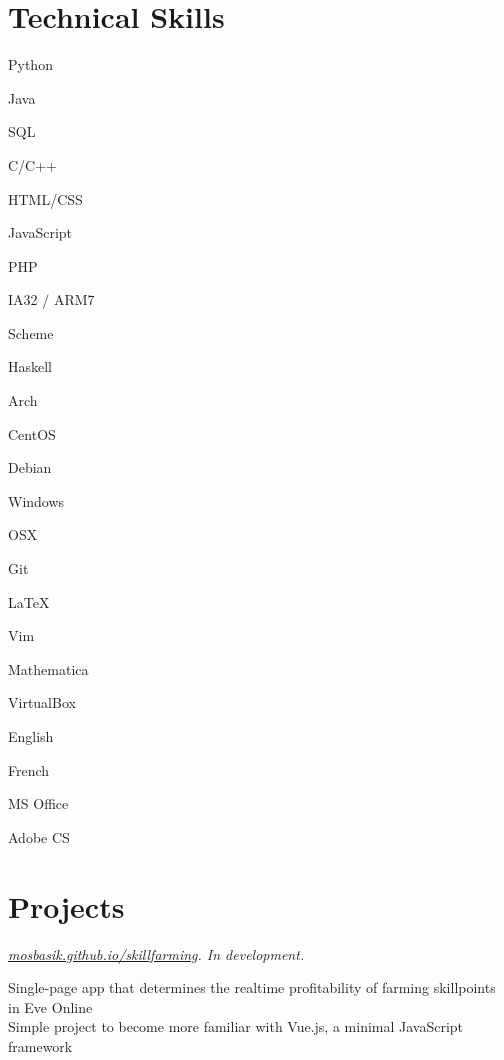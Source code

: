 \documentclass[10pt,letterpaper, full]{article}
\newcommand{\pjtitle}[1]{\renewcommand{\givenpjtitle}{#1}}
\newcommand{\pjtime}[1]{\renewcommand{\givenpjtime}{#1}}
\newcommand{\pjbody}[1]{\renewcommand{\givenpjbody}{#1}}
\newcommand{\givenpjtitle}{REQUIRED!}
\newcommand{\givenpjtime}{REQUIRED!}
\newcommand{\givenpjbody}{REQUIRED!}
\newenvironment{projectenv}
    {
        \begin{adjustwidth}{1em}{0em}
    }
    {
        \textit{\givenpjtitle. \givenpjtime.}

        \begin{minipage}[l]{\textwidth}
            \givenpjbody%
        \end{minipage}\\%


        \end{adjustwidth}
    }
\begin{document}
\section{Technical Skills}
\begin{adjustwidth}{1em}{0em}
    \begin{minipage}[t]{.195\textwidth}
        Python

        Java

        SQL

        C/C++

        HTML/CSS

    \end{minipage}%
    \begin{minipage}[t]{.195\textwidth}
        JavaScript

        PHP

        IA32 / ARM7

        Scheme

        Haskell
    \end{minipage}%
    \begin{minipage}[t]{.195\textwidth}
        Arch

        CentOS

        Debian

        Windows

        OSX
    \end{minipage}%
    \begin{minipage}[t]{.195\textwidth}
        Git

        \LaTeX

        Vim

        Mathematica

        VirtualBox
    \end{minipage}%
    \begin{minipage}[t]{.195\textwidth}
        English

        French

        MS Office

        Adobe CS
    \end{minipage}%
\end{adjustwidth}


\section{Projects}
\begin{projectenv}
    \pjtitle{\href{http://mosbasik.github.io/skillfarming}{mosbasik.github.io/skillfarming}}
    \pjtime{In development}
    \pjbody{
        Single-page app that determines the realtime profitability of farming skillpoints in Eve Online\\
        Simple project to become more familiar with Vue.js, a minimal JavaScript framework
    }%
\end{projectenv}%
\end{document}

